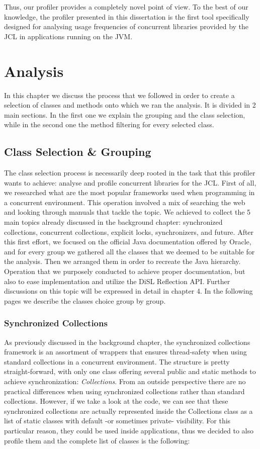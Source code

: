 \documentclass[]{usiinfthesis}
\begin{document}
Thus, our profiler provides a completely novel point of view. To the best of our knowledge, the profiler presented in this dissertation is the first tool specifically designed for analysing usage frequencies of concurrent libraries provided by the JCL in applications running on the JVM.




\chapter{Analysis}
In this chapter we discuss the process that we followed in order to create a selection of classes and methods onto which we ran the analysis. It is divided in 2 main sections. In the first one we explain the grouping and the class selection, while in the second one the method filtering for every selected class.


\section{Class Selection \& Grouping}
The class selection process is necessarily deep rooted in the task that this profiler wants to achieve: analyse and profile concurrent libraries for the JCL. First of all, we researched what are the most popular frameworks used when programming in a concurrent environment. This operation involved a mix of searching the web and looking through manuals that tackle the topic. We achieved to collect the 5 main topics already  discussed in the background chapter: synchronized collections, concurrent collections, explicit locks, synchronizers, and future. After this first effort, we focused on the official Java documentation offered by Oracle, and for every group we gathered all the classes that we deemed to be suitable for the analysis. Then we arranged them in order to recreate the Java hierarchy. Operation that we purposely conducted to achieve proper documentation, but also to ease implementation and utilize the DiSL Reflection API. Further discussions on this topic will be expressed in detail in chapter 4. In the following pages we describe the classes choice group by group.

\subsection{Synchronized Collections}
As previously discussed in the background chapter, the synchronized collections framework is an assortment of wrappers that ensures thread-safety when using standard collections in a concurrent environment. The structure is pretty straight-forward, with only one class offering several public and static methods to achieve synchronization: \textit{Collections}. From an outside perspective there are no practical differences when using synchronized collections rather than standard collections. However, if we take a look at the code, we can see that these synchronized collections are actually represented inside the Collections class as a list of static classes with default -or sometimes private- visibility. For this particular reason, they could be used inside applications, thus we decided to also profile them and the complete list of classes is the following:
\end{document}
